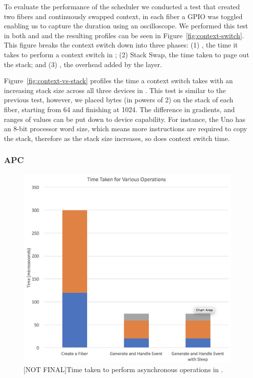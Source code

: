 To evaluate the performance of the scheduler we conducted a test that created two fibers and continuously swapped context, in each fiber a GPIO was toggled enabling us to capture the duration using an oscilloscope. We performed this test in both \MC and \CO and the resulting profiles can be seen in Figure~\ref{fig:context-switch}. This figure breaks the context switch down into three phases: (1) \CO, the time it takes to perform a context switch in \CO; (2) Stack Swap, the time taken to page out the \MC stack; and (3) \MC, the overhead added by the \MC layer.

Figure~\ref{fig:context-vs-stack} profiles the time a context switch takes with an increasing stack size across all three devices in \CO. This test is similar to the previous test, however, we placed bytes (in powers of 2) on the stack of each fiber, starting from 64 and finishing at 1024. The difference in gradients, and ranges of values can be put down to device capability. For instance, the Uno has an 8-bit processor word size, which means more instructions are required to copy the stack, therefore as the stack size increases, so does context switch time.

\subsubsection{APC}

\begin{figure}[ht]
    \includegraphics[width=.75\columnwidth]{images/time-taken.png}
\caption{\label{fig:time-taken}[NOT FINAL]Time taken to perform asynchronous operations in \CO.}
\end{figure}

